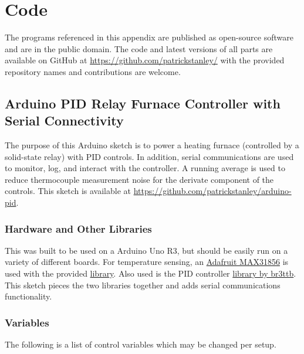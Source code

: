 

\chapter{Code}
    The programs referenced in this appendix are published as open-source software and are in the public domain.
    The code and latest versions of all parts are available on GitHub at \href{https://github.com/patrickstanley}{https://github.com/patrickstanley/} with the provided repository names and contributions are welcome.

\section{Arduino PID Relay Furnace Controller with Serial Connectivity}
    \label{app:PID}

    The purpose of this Arduino sketch is to power a heating furnace
    (controlled by a solid-state relay) with PID controls.
    In addition, serial communications are used to monitor, log, and interact with the controller.
    A running average is used to reduce thermocouple measurement noise for the derivate component of the controls.
    This sketch is available at \href{https://github.com/patrickstanley/arduino-pid}{https://github.com/patrickstanley/arduino-pid}.

    \subsection{Hardware and Other Libraries}
        This was built to be used on a Arduino Uno R3, but should be easily run on a variety of different boards.
        For temperature sensing, an \href{https://www.adafruit.com/product/3263}{Adafruit MAX31856} is used with the provided \href{https://github.com/adafruit/Adafruit_MAX31856}{library}.
        Also used is the PID controller \href{https://github.com/br3ttb/Arduino-PID-Library}{library by br3ttb}.
        This sketch pieces the two libraries together and adds serial communications functionality.

    \subsection{Variables}
        The following is a list of control variables which may be changed per setup.

